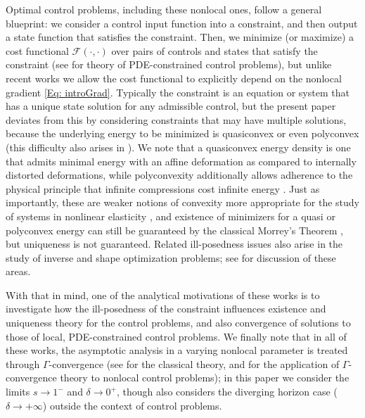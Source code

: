 \documentclass[11pt, reqno]{amsart}   	%
\theoremstyle{plain}
\numberwithin{equation}{section}
\def\de{\delta}
\def\Ga{\Gamma}
\begin{document}
 Optimal control problems, including these nonlocal ones, follow a general blueprint: we consider a control input function into a constraint, and then output a state function that satisfies the constraint. Then, we minimize (or maximize) a cost functional $\mathcal{F}(\cdot, \cdot)$ over pairs of controls and states that satisfy the constraint (see \cite{hinze2008optimization, troltzsch2010optimal} for theory of PDE-constrained control problems), but unlike recent works \cite{cueto2026localization, d2014optimal, mengesha2023control, munoz2022local} we allow the cost functional to explicitly depend on the nonlocal gradient \eqref{Eq: introGrad}. Typically the constraint is an equation or system that has a unique state solution for any admissible control, but the present paper deviates from this by considering constraints that may have multiple solutions, because the underlying energy to be minimized is quasiconvex or even polyconvex (this difficulty also arises in \cite{cueto2026localization, siktar2024superlinear}). We note that a quasiconvex energy density is one that admits minimal energy with an affine deformation as compared to internally distorted deformations, while polyconvexity additionally allows adherence to the physical principle that infinite compressions cost infinite energy \cite{dacorogna2007direct, Rin}. Just as importantly, these are weaker notions of convexity more appropriate for the study of systems in nonlinear elasticity \cite{ball1976convexity}, and existence of minimizers for a quasi or polyconvex energy can still be guaranteed by the classical Morrey's Theorem \cite{acerbi1984semicontinuity, marcellini1985approximation, meyers1965quasi, morrey1952quasi}, but uniqueness is not guaranteed. Related ill-posedness issues also arise in the study of inverse and shape optimization problems; see \cite{allaire2001some, cherkaev1997topics} for discussion of these areas.

 With that in mind, one of the analytical motivations of these works is to investigate how the ill-posedness of the constraint influences existence and uniqueness theory for the control problems, and also convergence of solutions to those of local, PDE-constrained control problems.  
 We finally note that in all of these works, the asymptotic analysis in a varying nonlocal parameter is treated through $\Ga$-convergence (see \cite{buttazzo1982gamma, dal2012introduction} for the classical theory, and \cite{bellido2020bond, cueto2025gamma, cueto2026localization,  mengesha2023control, mengesha2025design, munoz2022local, schonberger2024nonlocal}  for the application of $\Ga$-convergence theory to nonlocal control problems); in this paper we consider the limits $s \rightarrow 1^-$ and $\de \rightarrow 0^+$, though \cite{cueto2025gamma} also considers the diverging horizon case ($\de \rightarrow +\infty$) outside the context of control problems. 
\end{document}
